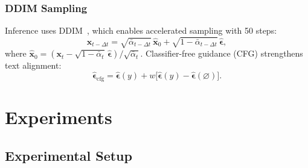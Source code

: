 \documentclass{ieeeaccess}
\begin{document}
\subsubsection{DDIM Sampling}

Inference uses DDIM~\cite{song2020denoising}, which enables accelerated sampling with 50 steps:
\begin{equation}
    \mathbf{x}_{t-\Delta t} = \sqrt{\bar{\alpha}_{t-\Delta t}} \, \hat{\mathbf{x}}_0 + \sqrt{1-\bar{\alpha}_{t-\Delta t}} \, \hat{\boldsymbol{\epsilon}},
\end{equation}
where $\hat{\mathbf{x}}_0 = (\mathbf{x}_t - \sqrt{1-\bar{\alpha}_t}\,\hat{\boldsymbol{\epsilon}})/\sqrt{\bar{\alpha}_t}$. Classifier-free guidance (CFG) strengthens text alignment:
\begin{equation}
    \hat{\boldsymbol{\epsilon}}_\mathrm{cfg} = \hat{\boldsymbol{\epsilon}}(y) + w \bigl[\hat{\boldsymbol{\epsilon}}(y) - \hat{\boldsymbol{\epsilon}}(\varnothing)\bigr].
\end{equation}

\section{Experiments}
\label{sec:experiments}

\subsection{Experimental Setup}
\end{document}
